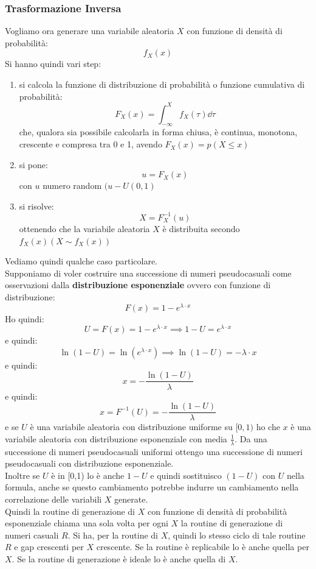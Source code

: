 \documentclass[a4paper,12pt, oneside]{book}
\begin{document}
\subsubsection{Trasformazione Inversa}
Vogliamo ora generare una variabile aleatoria $X$ con funzione di densità di
probabilità:
\[f_X(x)\]
Si hanno quindi vari step:
\begin{enumerate}
  \item si calcola la funzione di distribuzione di probabilità o funzione
  cumulativa di probabilità:
  \[F_X(x)=\int_{-\infty}^Xf_X(\tau)\dd{\tau}\]
  che, qualora sia possibile calcolarla in forma chiusa, è continua, monotona,
  crescente e compresa tra 0 e 1, avendo $F_X(x)=p(X\leq x)$
  \item si pone:
  \[u=F_X(x)\]
  con $u$ numero random $(u-U(0,1)$
  \item si risolve:
  \[X=F_X^{-1}(u)\]
  ottenendo che la variabile aleatoria $X$ è distribuita secondo $f_X(x)(X\sim
  f_X(x))$ 
\end{enumerate}
Vediamo quindi qualche caso particolare.\\
Supponiamo di voler costruire una successione di numeri pseudocasuali come
osservazioni dalla \textbf{distribuzione esponenziale} ovvero con funzione di
distribuzione:
\[F(x)=1-e^{\lambda\cdot x}\]
Ho quindi:
\[U=F(x)=1-e^{\lambda\cdot x}\implies 1-U=e^{\lambda\cdot x}\]
e quindi:
\[\ln(1-U)=\ln(e^{\lambda\cdot x})\implies \ln(1-U)=-\lambda\cdot x\]
e quindi:
\[x=-\frac{\ln(1-U)}{\lambda}\]
e quindi:
\[x=F^{-1}(U)=-\frac{\ln(1-U)}{\lambda}\]
e se $U$ è una variabile aleatoria con distribuzione uniforme su $[0,1)$ ho che
$x$ è una variabile aleatoria con distribuzione esponenziale con media
$\frac{1}{\lambda}$. Da una successione di numeri pseudocasuali uniformi ottengo
una successione di numeri pseudocasuali con distribuzione esponenziale. \\
Inoltre se $U$ è in [0,1) lo è anche $1-U$ e quindi sostituisco $(1-U)$ con $U$
nella formula, anche se questo cambiamento potrebbe indurre un cambiamento nella
correlazione delle variabili $X$ generate. \\
Quindi la routine di generazione di $X$ con funzione di densità di probabilità
esponenziale chiama una sola volta per ogni $X$ la routine di generazione di
numeri casuali $R$. Si ha, per la routine di $X$, quindi lo stesso ciclo di tale
routine $R$ e gap crescenti per 
$X$ crescente. Se la routine è replicabile lo è anche quella per $X$. Se la
routine di generazione è ideale lo è anche quella di $X$.\\
\end{document}
